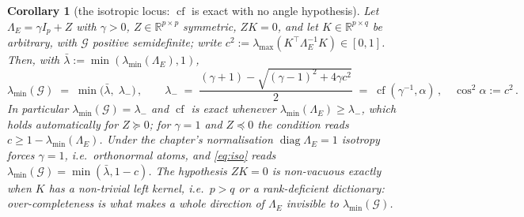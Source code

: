 \documentclass[11pt]{article}
\newtheorem{corollary}[theorem]{Corollary}
\theoremstyle{remark}
\newcommand{\Gr}{\mathcal{G}}
\newcommand{\Le}{\Lambda_E}
\begin{document}
\begin{corollary}[the isotropic locus: $\operatorname{cf}$ is exact with no angle hypothesis]
\label{cor:iso}
Let $\Le=\gamma I_p+Z$ with $\gamma>0$, $Z\in\mathbb R^{p\times p}$ symmetric, $ZK=0$, and let
$K\in\mathbb R^{p\times q}$ be arbitrary, with $\Gr$ positive semidefinite; write
$c^{2}:=\lambda_{\max}(K^{\top}\Le^{-1}K)\in[0,1]$. Then, with
$\bar\lambda:=\min(\lambda_{\min}(\Le),1)$,
\begin{equation}\label{eq:iso}
  \lambda_{\min}(\Gr)\;=\;\min\!\bigl(\bar\lambda,\;\lambda_-\bigr)\,,\qquad
  \lambda_-\;=\;\frac{(\gamma+1)-\sqrt{(\gamma-1)^{2}+4\gamma c^{2}}}{2}
  \;=\;\operatorname{cf}(\gamma^{-1},\alpha)\,,\quad \cos^{2}\alpha:=c^{2}\,.
\end{equation}
In particular $\lambda_{\min}(\Gr)=\lambda_-$ \emph{and $\operatorname{cf}$ is exact} whenever
$\lambda_{\min}(\Le)\ge\lambda_-$, which holds automatically for $Z\succeq0$; for $\gamma=1$ and
$Z\preceq0$ the condition reads $c\ge1-\lambda_{\min}(\Le)$. Under the chapter's normalisation
$\operatorname{diag}\Le=1$ isotropy forces $\gamma=1$, \emph{i.e.}\ orthonormal atoms, and
\eqref{eq:iso} reads $\lambda_{\min}(\Gr)=\min(\bar\lambda,1-c)$. The hypothesis $ZK=0$ is
non-vacuous exactly when $K$ has a non-trivial left kernel, \emph{i.e.}\ $p>q$ or a rank-deficient
dictionary: over-completeness is what makes a whole direction of $\Le$ invisible to
$\lambda_{\min}(\Gr)$.
\end{corollary}
\end{document}
